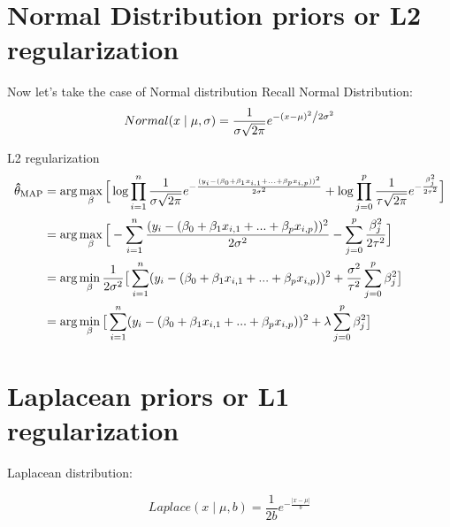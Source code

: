 \section{Normal Distribution priors or L2 regularization}
Now let's take the case of Normal distribution 
Recall Normal Distribution:
\begin{equation}
Normal(x \mid \mu,\sigma) = \frac{1}{{\sigma \sqrt {2\pi } }}e^{{{ - \left( {x - \mu } \right)^2 } \mathord{\left/ {\vphantom {{ - \left( {x - \mu } \right)^2 } {2\sigma ^2 }}} \right. \kern-\nulldelimiterspace} {2\sigma ^2 }}}    
\end{equation}


L2 regularization 
\begin{equation}
    \begin{split}
        {\bf \hat{\theta}_{\text{MAP}}} & = \arg\max_{\bf \beta} \Big[ \log \prod_{i=1}^{n} \frac{1}{\sigma\sqrt{2\pi}}e^{-\frac{(y_i- (\beta_0 + \beta_1 x_{i,1} + ... + \beta_p x_{i,p}))^2}{2\sigma^2}} + \log \prod_{j=0}^{p} \frac{1}{\tau\sqrt{2\pi}}e^{-\frac{\beta_j^2}{2\tau^2}} \Big] \\
& = \arg\max_{\bf \beta} \Big[- \sum_{i=1}^{n} {\frac{(y_i- (\beta_0 + \beta_1 x_{i,1} + ... + \beta_p x_{i,p}))^2}{2\sigma^2}} - \sum_{j=0}^{p} {\frac{\beta_j^2}{2\tau^2}} \Big]\\
& = \arg\min_{\bf \beta} \frac{1}{2\sigma^2} \big[ \sum_{i=1}^{n} (y_i-(\beta_0 + \beta_1 x_{i,1} + ... + \beta_p x_{i,p}))^2 + \frac{\sigma^2}{\tau^2} \sum_{j=0}^{p} \beta_j^2 \big] \\
& = \arg\min_{\bf \beta} \big[ \sum_{i=1}^{n} (y_i-(\beta_0 + \beta_1 x_{i,1} + ... + \beta_p x_{i,p}))^2 + \lambda \sum_{j=0}^{p} \beta_j^2 \big]
    \end{split}
\end{equation}

\section{Laplacean priors or L1 regularization}
Laplacean distribution:

\begin{equation}
Laplace(x \mid \mu, b) = \frac{1}{2b} e^{-\frac{|x-\mu|}{b}}
\end{equation}

